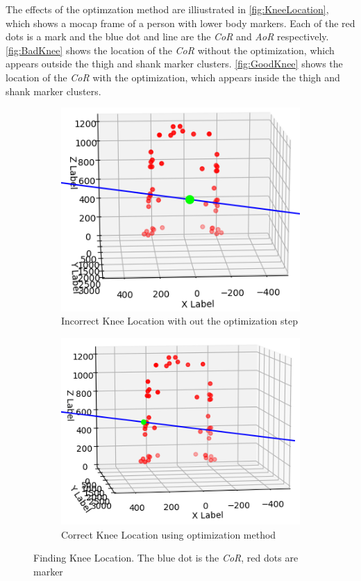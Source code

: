 The effects of the optimzation method are illiustrated in \autoref{fig:KneeLocation}, which shows a mocap frame of a person with lower body markers. Each of the red dots is a mark and the blue dot and line are the \textit{CoR} and \textit{AoR} respectively. \autoref{fig:BadKnee} shows the location of the \textit{CoR} without the optimization, which appears outside the thigh and shank marker clusters. \autoref{fig:GoodKnee} shows the location of the \textit{CoR} with the optimization, which appears inside the thigh and shank marker clusters.



\begin{figure}[]
    \centering
    \begin{subfigure}{.45\textwidth}
        \centering
        \includegraphics[scale=0.40]{images/software/bad_knee_edit.png}
        \caption[Incorrect Knee Location]{Incorrect Knee Location with out the optimization step}
        \label{fig:BadKnee}
    \end{subfigure}%
    \hfill
    \begin{subfigure}{.45\textwidth}
        \centering
        \includegraphics[scale=0.40]{images/software/good_knee_edit.png}
        \caption[Correct Knee Location]{Correct Knee Location using optimization method}
        \label{fig:GoodKnee}
    \end{subfigure}
    \caption[Finding Knee location]{Finding Knee Location. The blue dot is the \textit{CoR}, red dots are marker}
    \label{fig:KneeLocation}
\end{figure}

